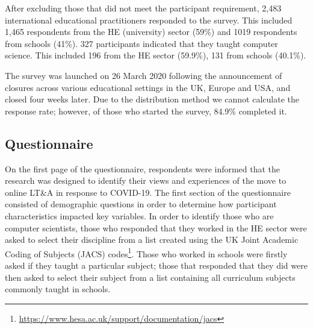 \documentclass[conference]{IEEEtran}
\begin{document}
After excluding those that did not meet the participant requirement,
2,483 international educational practitioners responded to the
survey. This included 1,465 respondents from the HE (university)
sector (59\%) and 1019 respondents from schools (41\%). 327
participants indicated that they taught computer science. This
included 196 from the HE sector (59.9\%), 131 from schools (40.1\%).


The survey was launched on 26 March 2020 following the announcement of
closures across various educational settings in the UK, Europe and
USA, and closed four weeks later. Due to the distribution method we
cannot calculate the response rate; however, of those who started the
survey, 84.9\% completed it.

\subsection{Questionnaire}


On the first page of the questionnaire, respondents were informed that
the research was designed to identify their views and experiences of
the move to online LT\&A in response to COVID-19. The first section of
the questionnaire consisted of demographic questions in order to
determine how participant characteristics impacted key variables. In
order to identify those who are computer scientists, those who
responded that they worked in the HE sector were asked to select their
discipline from a list created using the UK Joint Academic Coding of
Subjects (JACS)
codes\footnote{\url{https://www.hesa.ac.uk/support/documentation/jacs}}. Those
who worked in schools were firstly asked if they taught a particular
subject; those that responded that they did were then asked to select
their subject from a list containing all curriculum subjects commonly
taught in schools.
\end{document}
